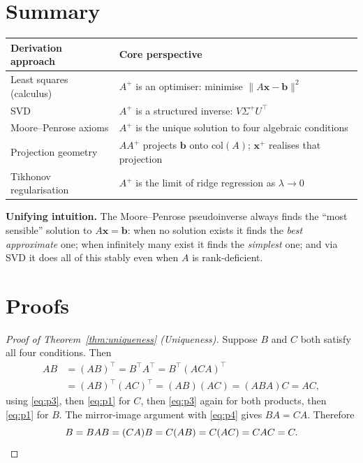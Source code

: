 \documentclass[12pt, a4paper]{article}
\theoremstyle{definition}
\begin{document}
\section{Summary}

\begin{center}
\renewcommand{\arraystretch}{1.5}
\begin{tabular}{ll}
    \toprule
    \textbf{Derivation approach} & \textbf{Core perspective} \\
    \midrule
    Least squares (calculus)   & $A^+$ is an optimiser: minimise $\|A\mathbf{x}-\mathbf{b}\|^2$ \\
    SVD                        & $A^+$ is a structured inverse: $V\Sigma^+U^\top$ \\
    Moore--Penrose axioms       & $A^+$ is the unique solution to four algebraic conditions \\
    Projection geometry        & $AA^+$ projects $\mathbf{b}$ onto $\text{col}(A)$; $\mathbf{x}^+$ realises that projection \\
    Tikhonov regularisation    & $A^+$ is the limit of ridge regression as $\lambda \to 0$ \\
    \bottomrule
\end{tabular}
\end{center}

\begin{keybox}
\textbf{Unifying intuition.} The Moore--Penrose pseudoinverse always finds the ``most sensible'' solution to $A\mathbf{x} = \mathbf{b}$: when no solution exists it finds the \emph{best approximate} one; when infinitely many exist it finds the \emph{simplest} one; and via SVD it does all of this stably even when $A$ is rank-deficient.
\end{keybox}

\appendix
\section{Proofs}
\label{app:proofs}

\begin{proof}[Proof of Theorem~\ref{thm:uniqueness} (Uniqueness)]
Suppose $B$ and $C$ both satisfy all four conditions. Then
\begin{align*}
    AB &= (AB)^\top = B^\top A^\top = B^\top (ACA)^\top \\
       &= (AB)^\top (AC)^\top = (AB)(AC) = (ABA)C = AC,
\end{align*}
using \eqref{eq:p3}, then \eqref{eq:p1} for $C$, then \eqref{eq:p3} again for both products, then \eqref{eq:p1} for $B$. The mirror-image argument with \eqref{eq:p4} gives $BA = CA$. Therefore
\[
    B = BAB = (CA)B = C(AB) = C(AC) = CAC = C. \qedhere
\]
\end{proof}
\end{document}
